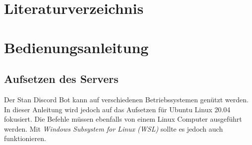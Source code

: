 \documentclass[a4paper, table]{article}
\begin{document}
\section{Literaturverzeichnis}
\printbibliography

\newpage
\section{Bedienungsanleitung}\label{Bedienungsanleitung}

\subsection{Aufsetzen des Servers}

Der Stan Discord Bot kann auf verschiedenen Betriebssystemen genützt werden.
In dieser Anleitung wird jedoch auf das Aufsetzen für Ubuntu Linux 20.04 fokusiert.
Die Befehle müssen ebenfalls von einem Linux Computer ausgeführt werden.
Mit \textit{Windows Subsystem for Linux (WSL)} sollte es jedoch auch funktionieren.
\end{document}

